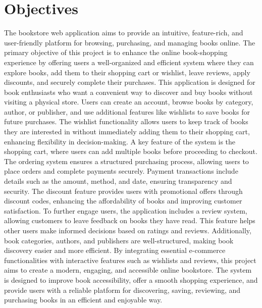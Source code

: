\section{Objectives}

The bookstore web application aims to provide an intuitive, feature-rich, and user-friendly platform for browsing, purchasing, and managing books online. The primary objective of this project is to enhance the online book-shopping experience by offering users a well-organized and efficient system where they can explore books, add them to their shopping cart or wishlist, leave reviews, apply discounts, and securely complete their purchases.
This application is designed for book enthusiasts who want a convenient way to discover and buy books without visiting a physical store. Users can create an account, browse books by category, author, or publisher, and use additional features like wishlists to save books for future purchases. The wishlist functionality allows users to keep track of books they are interested in without immediately adding them to their shopping cart, enhancing flexibility in decision-making.
A key feature of the system is the shopping cart, where users can add multiple books before proceeding to checkout. The ordering system ensures a structured purchasing process, allowing users to place orders and complete payments securely. Payment transactions include details such as the amount, method, and date, ensuring transparency and security. The discount feature provides users with promotional offers through discount codes, enhancing the affordability of books and improving customer satisfaction.
To further engage users, the application includes a review system, allowing customers to leave feedback on books they have read. This feature helps other users make informed decisions based on ratings and reviews. Additionally, book categories, authors, and publishers are well-structured, making book discovery easier and more efficient.
By integrating essential e-commerce functionalities with interactive features such as wishlists and reviews, this project aims to create a modern, engaging, and accessible online bookstore. The system is designed to improve book accessibility, offer a smooth shopping experience, and provide users with a reliable platform for discovering, saving, reviewing, and purchasing books in an efficient and enjoyable way.